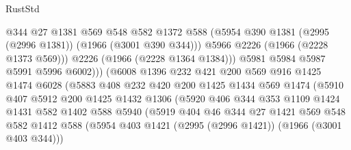 \begin{lexlean}{RustStd}
\begin{coremodule}
                                  @344
                                  @27
                                  @1381
                                  @569
                                  @548
                                  @582
                                  @1372
                                  @588
                                  (@5954 @390 @1381 (@2995 (@2996 @1381)) (@1966 (@3001 @390 @344)))
                                  @5966
                                  @2226
                                  (@1966 (@2228 @1373 @569)))
                                @2226
                                (@1966 (@2228 @1364 @1384)))
                              @5981
                              @5984
                              @5987
                              @5991
                              @5996
                              @6002)))
                        (@6008
                          @1396
                          @232
                          @421
                          @200
                          @569
                          @916
                          @1425
                          @1474
                          @6028
                          (@5883
                            @408
                            @232
                            @420
                            @200
                            @1425
                            @1434
                            @569
                            @1474
                            (@5910
                              @407
                              @5912
                              @200
                              @1425
                              @1432
                              @1306
                              (@5920
                                @406
                                @344
                                @353
                                @1109
                                @1424
                                @1431
                                @582
                                @1402
                                @588
                                @5940
                                (@5919
                                  @404
                                  @46
                                  @344
                                  @27
                                  @1421
                                  @569
                                  @548
                                  @582
                                  @1412
                                  @588
                                  (@5954 @403 @1421 (@2995 (@2996 @1421)) (@1966 (@3001 @403 @344)))

\end{coremodule}
\end{lexlean}
